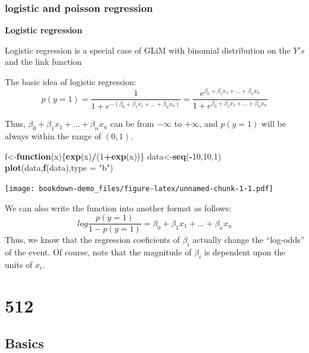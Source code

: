 \documentclass[]{book}
\newenvironment{Shaded}{\begin{snugshade}}{\end{snugshade}}
\newcommand{\ControlFlowTok}[1]{\textcolor[rgb]{0.13,0.29,0.53}{\textbf{#1}}}
\newcommand{\DataTypeTok}[1]{\textcolor[rgb]{0.13,0.29,0.53}{#1}}
\newcommand{\DecValTok}[1]{\textcolor[rgb]{0.00,0.00,0.81}{#1}}
\newcommand{\KeywordTok}[1]{\textcolor[rgb]{0.13,0.29,0.53}{\textbf{#1}}}
\newcommand{\NormalTok}[1]{#1}
\newcommand{\OperatorTok}[1]{\textcolor[rgb]{0.81,0.36,0.00}{\textbf{#1}}}
\newcommand{\StringTok}[1]{\textcolor[rgb]{0.31,0.60,0.02}{#1}}
\begin{document}
\hypertarget{logistic-and-poisson-regression}{%
\subsection{logistic and poisson regression}\label{logistic-and-poisson-regression}}

\textbf{Logistic regression}

Logistic regression is a special case of GLiM with binomial distribution on the \(Y's\) and the link function

The basic idea of logistic regression:
\[p(y=1)=\frac{1}{1+e^{-(\beta_0+\beta_1x_1+...+\beta_nx_n)}}=\frac{e^{\beta_0+\beta_1x_1+...+\beta_nx_n}}{1+e^{\beta_0+\beta_1x_1+...+\beta_nx_n}}\]

Thus, \(\beta_0+\beta_1x_1+...+\beta_nx_n\) can be from \(-\infty\) to \(+\infty\), and \(p(y=1)\) will be always within the range of \((0,1)\).

\begin{Shaded}
\begin{Highlighting}[]
\NormalTok{f<-}\ControlFlowTok{function}\NormalTok{(x)\{}\KeywordTok{exp}\NormalTok{(x)}\OperatorTok{/}\NormalTok{(}\DecValTok{1}\OperatorTok{+}\KeywordTok{exp}\NormalTok{(x))\}}
\NormalTok{data<-}\KeywordTok{seq}\NormalTok{(}\OperatorTok{-}\DecValTok{10}\NormalTok{,}\DecValTok{10}\NormalTok{,}\DecValTok{1}\NormalTok{)}
\KeywordTok{plot}\NormalTok{(data,}\KeywordTok{f}\NormalTok{(data),}\DataTypeTok{type =} \StringTok{"b"}\NormalTok{)}
\end{Highlighting}
\end{Shaded}

\texttt{[image: bookdown-demo\_files/figure-latex/unnamed-chunk-1-1.pdf]}

We can also write the function into another format as follows:
\[log \frac{p(y=1)}{1-p(y=1)}= \beta_0+\beta_1x_1+...+\beta_nx_n\]
Thus, we know that the regression coeficients of \(\beta_i\) actually change the ``log-odds'' of the event. Of course, note that the magnitude of \(\beta_i\) is dependent upon the units of \(x_i\).

\hypertarget{section-3}{%
\chapter{512}\label{section-3}}

\hypertarget{basics}{%
\section{Basics}\label{basics}}
\end{document}
